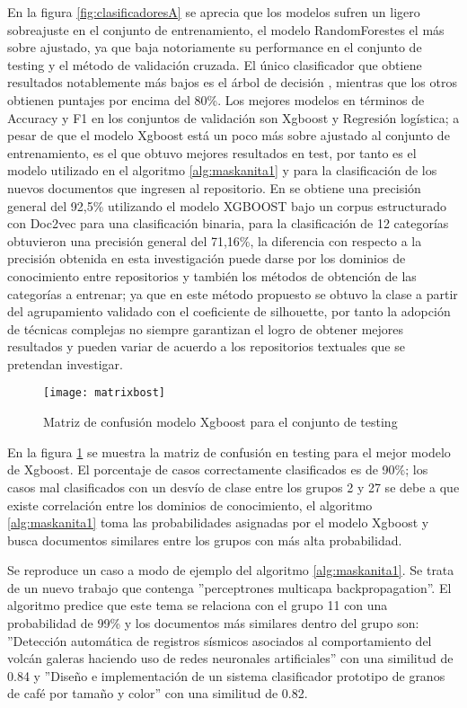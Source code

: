 En la figura \ref{fig:clasificadoresA} se aprecia que los modelos sufren un ligero sobreajuste en el conjunto de entrenamiento, el modelo RandomForestes el más sobre ajustado, ya que baja notoriamente su performance en el conjunto de testing y el método de validación cruzada.
El único clasificador que obtiene resultados notablemente más bajos es el árbol de decisión , mientras que los otros obtienen puntajes por encima del 80\%.
Los mejores modelos en términos de Accuracy y F1 en los conjuntos de validación son Xgboost y Regresión logística; a pesar de que el modelo Xgboost está un poco más sobre ajustado al conjunto de entrenamiento, es el que obtuvo mejores resultados en test, por tanto es el modelo utilizado  en el algoritmo \ref{alg:maskanita1} y para la clasificación  de los nuevos documentos que ingresen al repositorio. En \cite{seyfiouglu2017hierarchical} se obtiene una precisión general del 92,5\% utilizando el modelo XGBOOST bajo un corpus estructurado con Doc2vec para una clasificación binaria, para la clasificación de 12 categorías obtuvieron una precisión general del 71,16\%, la diferencia con respecto a la precisión obtenida en esta investigación puede darse por los dominios de conocimiento entre repositorios y también los métodos de obtención de las categorías a entrenar; ya que en este  método propuesto se obtuvo la clase a partir del agrupamiento validado con el coeficiente de silhouette, por tanto la adopción de técnicas complejas no siempre garantizan el logro de obtener mejores resultados y  pueden variar de acuerdo a los repositorios textuales que se pretendan investigar.

\begin{figure}[H]\centering
\texttt{[image: matrixbost]}
\caption{Matriz de confusión modelo Xgboost para el conjunto de testing}
\label{fig:mconf}
\end{figure}

En la figura \ref{fig:mconf} se muestra la matriz de confusión en testing para el mejor modelo de Xgboost. El porcentaje de casos correctamente clasificados es de 90\%; los casos mal clasificados con un desvío de clase entre los grupos 2 y 27 se debe a que existe correlación entre los dominios de conocimiento, el algoritmo  \ref{alg:maskanita1}  toma las probabilidades asignadas por el modelo Xgboost y busca documentos similares entre los grupos con más alta probabilidad.

Se reproduce un caso a modo de ejemplo del algoritmo \ref{alg:maskanita1}. Se trata de un nuevo trabajo que contenga ''perceptrones multicapa backpropagation''. El algoritmo predice que este tema se relaciona con el grupo 11 con una probabilidad de 99\% y los documentos más similares dentro del grupo son: 
''Detección automática de registros sísmicos asociados al comportamiento del volcán galeras haciendo uso de redes neuronales artificiales'' con una similitud de 0.84 y ''Diseño e implementación de un sistema clasificador prototipo de granos de café por tamaño y color'' con una similitud de 0.82.





